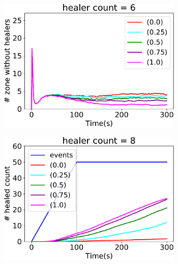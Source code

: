 \documentclass[jsan,article,accept,moreauthors,pdftex]{Definitions/mdpi}
\begin{document}
\begin{figure}[H]
\begin{subfigure}[b]{0.32\textwidth}
\end{subfigure}
\hfill
%
\begin{subfigure}[b]{0.30\textwidth}
\centering
\includegraphics[width=0.97\textwidth]{imgs/empty-zone-6.pdf}
\end{subfigure}
\par\bigskip %
\centering
\begin{subfigure}[b]{0.32\textwidth}
\centering
\includegraphics[width=0.97\textwidth]{imgs/healed-8.pdf}
\end{subfigure}
\hfill
%
\begin{subfigure}[b]{0.32\textwidth}
\centering

\end{subfigure}
\end{figure}
\end{document}
